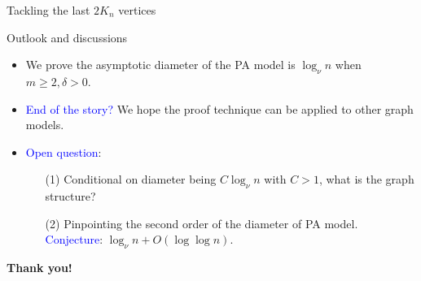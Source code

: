 \documentclass{beamer}
\theoremstyle{plain}
\theoremstyle{definition}
\begin{document}
\begin{frame}{Tackling the last $2K_n$ vertices}
    
\end{frame}

\begin{frame}{Outlook and discussions}
	\begin{itemize}
		\item We prove the asymptotic diameter of the PA model is $\log_\nu n$ when $m\geq 2,\delta>0$.
		\item \textcolor{blue}{End of the story?} We hope the proof technique can be applied to other graph models.
		\item \textcolor{blue}{Open question}: 
        \begin{itemize}
            \item[(1)] Conditional on diameter being $C\log_\nu n$ with $C>1$, what is the graph structure?
            \item[(2)] Pinpointing the second order of the diameter of PA model. \textcolor{blue}{Conjecture}: $\log_\nu n+O(\log\log n)$.
        \end{itemize}
        
	\end{itemize}
	\begin{center}
		\textbf{Thank you!}
	\end{center}
	
\end{frame}
\end{document}
